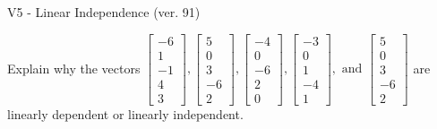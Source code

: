 \begin{exercise}
  \begin{exerciseTitle}V5 - Linear Independence (ver. 91)\end{exerciseTitle}
  \begin{exerciseStatement}
    Explain why the vectors \(\left[\begin{array}{r}
-6 \\
1 \\
-1 \\
4 \\
3
\end{array}\right] , \left[\begin{array}{r}
5 \\
0 \\
3 \\
-6 \\
2
\end{array}\right] , \left[\begin{array}{r}
-4 \\
0 \\
-6 \\
2 \\
0
\end{array}\right] , \left[\begin{array}{r}
-3 \\
0 \\
1 \\
-4 \\
1
\end{array}\right] , \text{ and } \left[\begin{array}{r}
5 \\
0 \\
3 \\
-6 \\
2
\end{array}\right]\) are linearly dependent or linearly independent.	



\end{exerciseStatement}
\end{exercise}
